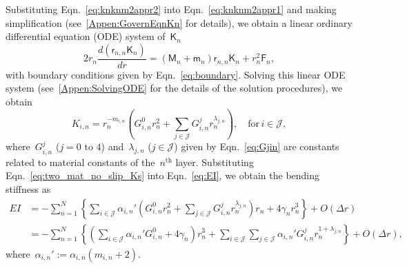 \documentclass[preprint,10pt,times]{elsarticle}
\numberwithin{equation}{section}
\renewcommand{\u}[1]{\boldsymbol{#1}}
\newcommand{\usf}[1]{\u{\mathsf #1}}
\renewcommand{\>}{$\Rightarrow$}
\begin{document}
Substituting Eqn.~\eqref{eq:knknm2appr2} into Eqn.~\eqref{eq:knknm2appr1} and making simplification (see~\ref{Appen:GovernEqnKn} for details), we obtain a linear ordinary differential equation (ODE) system of~$\usf{K}_n$
\begin{equation}
	2 r_n \frac{d (\usf{r}_{n,n}\usf{K}_n)}{dr} = \left( \usf{M}_n + \usf{m}_n \right) \usf{r}_{n,n}\usf{K}_n + r^2_n \usf{F}_n,
	\label{eq:GovernEqnKn}
\end{equation}
with boundary conditions given by Eqn.~\eqref{eq:boundary}. Solving this linear ODE system (see~\ref{Appen:SolvingODE} for the details of the solution procedures), we obtain
\begin{equation}
K_{i,n} = r_n^{-m_{i,n}} \left( G^0_{i,n} r^2_n + \sum_{j \in \mathcal{J}} G^j_{i,n} r^{\lambda_{j,n}}_n \right), \quad \text{for}\, i \in \mathcal{J},
\label{eq:two_mat_no_slip_Ks}
\end{equation}
where~$G^j_{i,n}$ ($j = \text{0 to 4}$) and~$\lambda_{j,n}$ ($j \in \mathcal{J}$) given by Eqn.~\eqref{eq:Gjin} are constants related to material constants of the~$n^{\text{th}}$ layer.
Substituting Eqn.~\eqref{eq:two_mat_no_slip_Ks} into Eqn.~\eqref{eq:EI}, we obtain the bending stiffness as
\begin{equation}
\begin{aligned}
	EI & = - \sum_{n=1}^{N} \left\lbrace \sum_{i \in \mathcal{J}} \alpha_{i,n}' \left( G^0_{i,n} r^2_n + \sum_{j \in \mathcal{J}} G^j_{i,n} r^{\lambda_{j,n}}_n \right) r_n + 4\gamma_n r_n^3 \right\rbrace + O(\Delta r) \\
	& =  - \sum_{n=1}^{N} \left\lbrace \left( \sum_{i \in \mathcal{J}} \alpha_{i,n}' G^0_{i,n} + 4\gamma_n \right) r_n^3+ \sum_{i \in \mathcal{J}} \sum_{j \in \mathcal{J}} \alpha_{i,n}' G^j_{i,n} r^{1 + \lambda_{j,n}}_n \right\rbrace + O(\Delta r),
\end{aligned}
\end{equation}
where~$\alpha_{i,n}' := \alpha_{i,n} \left( m_{i,n} + 2\right)$.
\end{document}
